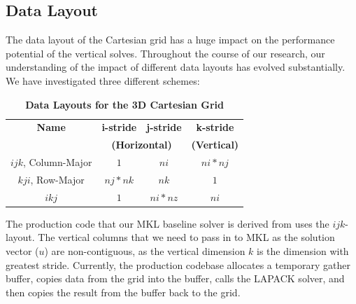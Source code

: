 \documentclass{sig-alternate-05-2015}
\begin{document}
\subsection{Data Layout}
\label{sec:implementation:data_layout}

The data layout of the Cartesian grid has a huge impact on the performance
  potential of the vertical solves.
Throughout the course of our research, our understanding of the impact of
  different data layouts has evolved substantially.
We have investigated three different schemes:
\begin{table}[h]
\centering
\caption{\textbf{Data Layouts for the 3D Cartesian Grid}}
\begin{tabular}[t]{|c|c|c|c|} \hline
\textbf{Name}         & \textbf{i-stride} & \textbf{j-stride} & \textbf{k-stride}   \\\cline{2-3}
                      & \multicolumn{2}{|c|}{\textbf{(Horizontal)}}                 & \textbf{(Vertical)} \\ \hline
\(ijk\), Column-Major & \(1\)             & \(ni\)            & \(ni * nj\)         \\ \hline
\(kji\), Row-Major    & \(nj * nk\)       & \(nk\)            & \(1\)               \\ \hline
\(ikj\)               & \(1\)             & \(ni * nz\)       & \(ni\)              \\ \hline
\end{tabular}
\label{tab:implementation:data_layout:layouts}
\end{table}

The production code that our MKL baseline solver is derived from uses the
  \(ijk\)-layout.
The vertical columns that we need to pass in to MKL as the solution vector
  (\(u\)) are non-contiguous, as the vertical dimension \(k\) is the dimension
  with greatest stride.
Currently, the production codebase allocates a temporary gather buffer, copies
  data from the grid into the buffer, calls the LAPACK solver, and then copies
  the result from the buffer back to the grid.
\end{document}
